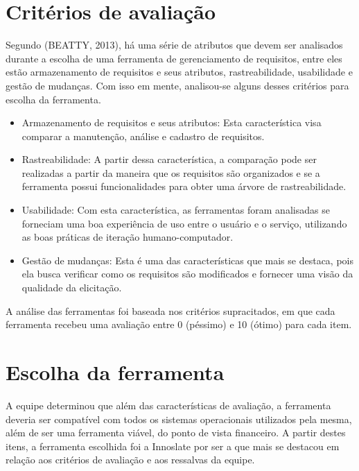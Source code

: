 \section{Critérios de avaliação}

Segundo (BEATTY, 2013), há uma série de atributos que devem ser analisados durante a escolha de uma ferramenta de gerenciamento de requisitos, entre eles estão armazenamento de requisitos e seus atributos, rastreabilidade, usabilidade e gestão de mudanças. Com isso em mente, analisou-se alguns desses critérios para escolha da ferramenta.

\begin{itemize}
\item Armazenamento de requisitos e seus atributos: Esta característica visa comparar a manutenção, análise e cadastro de requisitos.
\item Rastreabilidade: A partir dessa característica, a comparação pode ser realizadas a partir da maneira que os requisitos são organizados e se a ferramenta possui funcionalidades para obter uma árvore de rastreabilidade.
\item Usabilidade: Com esta característica, as ferramentas foram analisadas se forneciam uma boa experiência de uso entre o usuário e o serviço, utilizando as boas práticas de iteração humano-computador.
\item Gestão de mudanças: Esta é uma das características que mais se destaca, pois ela busca verificar como os requisitos são modificados e fornecer uma visão da qualidade da elicitação.
\end{itemize}

A análise das ferramentas foi baseada nos critérios supracitados, em que cada ferramenta recebeu uma avaliação entre 0 (péssimo) e 10 (ótimo) para cada item.

\section{Escolha da ferramenta}

A equipe determinou que além das características de avaliação, a ferramenta deveria ser compatível com todos os sistemas operacionais utilizados pela mesma, além de ser uma ferramenta viável, do ponto de vista financeiro. A partir destes itens, a ferramenta escolhida foi a Innoslate por ser a que mais se destacou em relação aos critérios de avaliação e aos ressalvas da equipe.


